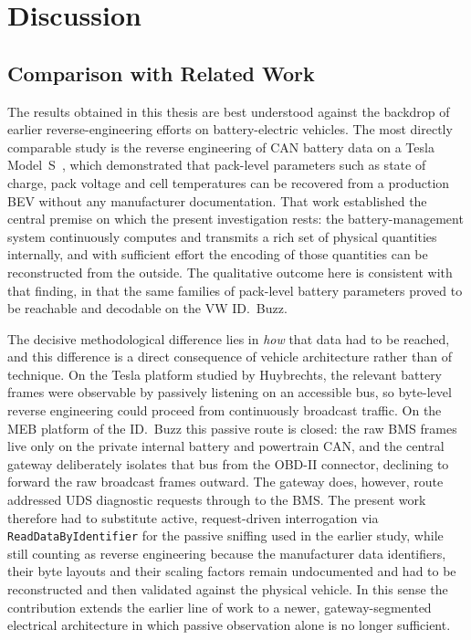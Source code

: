 \documentclass[11pt,a4paper,oneside,parskip=half]{scrreprt}
\begin{document}

\chapter{Discussion}
\section{Comparison with Related Work}
The results obtained in this thesis are best understood against the backdrop of earlier reverse-engineering efforts on battery-electric vehicles. The most directly comparable study is the reverse engineering of CAN battery data on a Tesla Model~S~\cite{huybrechts2018reverse}, which demonstrated that pack-level parameters such as state of charge, pack voltage and cell temperatures can be recovered from a production BEV without any manufacturer documentation. That work established the central premise on which the present investigation rests: the battery-management system continuously computes and transmits a rich set of physical quantities internally, and with sufficient effort the encoding of those quantities can be reconstructed from the outside. The qualitative outcome here is consistent with that finding, in that the same families of pack-level battery parameters proved to be reachable and decodable on the VW ID.~Buzz.

The decisive methodological difference lies in \emph{how} that data had to be reached, and this difference is a direct consequence of vehicle architecture rather than of technique. On the Tesla platform studied by Huybrechts, the relevant battery frames were observable by passively listening on an accessible bus, so byte-level reverse engineering could proceed from continuously broadcast traffic. On the MEB platform of the ID.~Buzz this passive route is closed: the raw BMS frames live only on the private internal battery and powertrain CAN, and the central gateway deliberately isolates that bus from the OBD-II connector, declining to forward the raw broadcast frames outward. The gateway does, however, route addressed UDS diagnostic requests through to the BMS. The present work therefore had to substitute active, request-driven interrogation via \texttt{ReadDataByIdentifier} for the passive sniffing used in the earlier study, while still counting as reverse engineering because the manufacturer data identifiers, their byte layouts and their scaling factors remain undocumented and had to be reconstructed and then validated against the physical vehicle. In this sense the contribution extends the earlier line of work to a newer, gateway-segmented electrical architecture in which passive observation alone is no longer sufficient.
\end{document}

